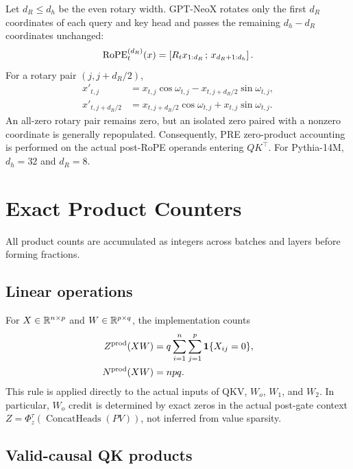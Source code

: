 Let $d_R\le d_h$ be the even rotary width. GPT-NeoX rotates only the first
$d_R$ coordinates of each query and key head and passes the remaining
$d_h-d_R$ coordinates unchanged:
\begin{equation}
    \operatorname{RoPE}_t^{(d_R)}(x)
      =\left[R_t x_{1:d_R}\,;\,x_{d_R+1:d_h}\right].
    \label{eq:partial-rope}
\end{equation}
For a rotary pair $(j,j+d_R/2)$,
\begin{align}
    x'_{t,j}
      &=x_{t,j}\cos\omega_{t,j}
        -x_{t,j+d_R/2}\sin\omega_{t,j},
    \label{eq:rope-first}\\
    x'_{t,j+d_R/2}
      &=x_{t,j+d_R/2}\cos\omega_{t,j}
        +x_{t,j}\sin\omega_{t,j}.
    \label{eq:rope-second}
\end{align}
An all-zero rotary pair remains zero, but an isolated zero paired with a
nonzero coordinate is generally repopulated. Consequently, PRE zero-product
accounting is performed on the actual post-RoPE operands entering $QK^\top$.
For Pythia-14M, $d_h=32$ and $d_R=8$.

\section{Exact Product Counters}
\label{app:product-counters}

All product counts are accumulated as integers across batches and layers before
forming fractions.

\subsection{Linear operations}

For $X\in\mathbb{R}^{n\times p}$ and $W\in\mathbb{R}^{p\times q}$, the implementation counts
\begin{align}
    Z^{\mathrm{prod}}(XW)
      &=q\sum_{i=1}^{n}\sum_{j=1}^{p}\mathbf{1}\{X_{ij}=0\},
    \label{eq:linear-zero-products}\\
    N^{\mathrm{prod}}(XW)&=npq.
    \label{eq:linear-total-products}
\end{align}
This rule is applied directly to the actual inputs of QKV, $W_o$, $W_1$, and
$W_2$. In particular, $W_o$ credit is determined by exact zeros in the actual
post-gate context $Z=\Phi_z^\tau(\operatorname{ConcatHeads}(PV))$, not inferred
from value sparsity.

\subsection{Valid-causal QK products}

